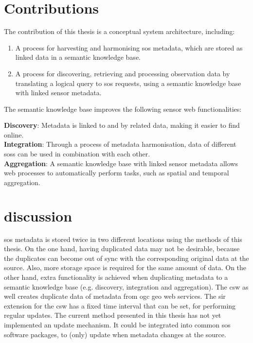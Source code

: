 \section{Contributions}
\label{contributions}

The contribution of this thesis is a conceptual system architecture, including:
\begin{enumerate}
	\item A process for harvesting and harmonising \ac{sos} metadata, which are stored as linked data in a semantic knowledge base.
	\item A process for discovering, retrieving and processing observation data by translating a logical query to \ac{sos} requests, using a semantic knowledge base with linked sensor metadata. 
\end{enumerate}

The semantic knowledge base improves the following sensor web functionalities:\\
\begin{addmargin}[0.5cm]{0cm}
	\textbf{Discovery}: Metadata is linked to and by related data, making it easier to find online.\\
	\textbf{Integration}: Through a process of metadata harmonisation, data of different \aclp{sos} can be used in combination with each other.  \\
	\textbf{Aggregation}: A semantic knowledge base with linked sensor metadata allows web processes to automatically perform tasks, such as spatial and temporal aggregation. 
\end{addmargin}


\section{discussion}
\label{discussion}

\ac{sos} metadata is stored twice in two different locations using the methods of this thesis. On the one hand, having duplicated data may not be desirable, because the duplicates can become out of sync with the corresponding original data at the source. Also, more storage space is required for the same amount of data. On the other hand, extra functionality is achieved when duplicating metadata to a semantic knowledge base (e.g. discovery, integration and aggregation). The \ac{csw} as well creates duplicate data of metadata from \ac{ogc} geo web services. The \acs{sir} extension for the \ac{csw} has a fixed time interval that can be set, for performing regular updates. The current method presented in this thesis has not yet implemented an update mechanism. It could be integrated into common \ac{sos} software packages, to (only) update when metadata changes at the source. 

